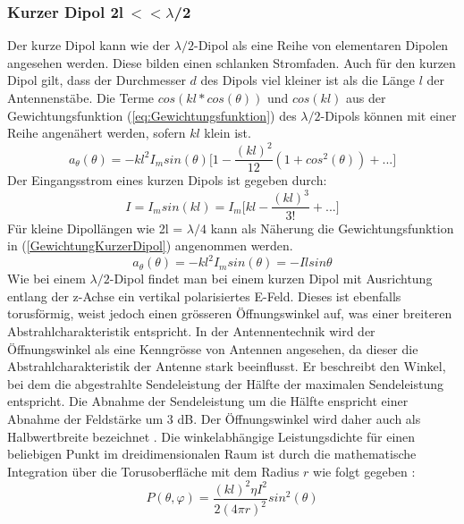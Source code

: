 \newpage
\subsubsection{Kurzer Dipol 2l$ \ <<\lambda$/2}\label{sec:kurzerDipol}
Der kurze Dipol kann wie der $\lambda /2$-Dipol als eine Reihe von elementaren Dipolen angesehen werden. Diese bilden einen schlanken Stromfaden. Auch für den kurzen Dipol gilt, dass der Durchmesser $d$ des Dipols viel kleiner ist als die Länge $l$ der Antennenstäbe. Die Terme $cos(kl*cos(\theta)) $ und $cos(kl)$ aus der Gewichtungsfunktion (\ref{eq:Gewichtungsfunktion}) des $\lambda/2$-Dipols können mit einer Reihe angenähert werden, sofern $kl$ klein ist.
\begin{equation}
a_{\theta}(\theta)=-kl^{2}I_{m}sin(\theta) \biggl\lbrack 1- \frac{(kl)^{2}}{12}(1+cos^{2}(\theta))+...\biggr\rbrack
\end{equation}
Der Eingangsstrom eines kurzen Dipols ist gegeben durch:
\begin{equation}
I=I_{m}sin(kl)=I_{m}\biggl\lbrack kl - \frac{(kl)^{3}}{3!} +... \biggr\rbrack
\end{equation}
 Für kleine Dipollängen wie 2l = $\lambda/4 $ kann als Näherung die Gewichtungsfunktion in (\ref{GewichtungKurzerDipol}) angenommen werden.
\begin{equation}\label{GewichtungKurzerDipol}
a_{\theta}(\theta)=-kl^{2}I_{m}sin(\theta)=-Ilsin\theta
\end{equation}
Wie bei einem $\lambda/2$-Dipol findet man bei einem kurzen Dipol mit Ausrichtung entlang der z-Achse ein vertikal polarisiertes E-Feld. Dieses ist ebenfalls torusförmig, weist jedoch einen grösseren Öffnungswinkel auf, was einer breiteren Abstrahlcharakteristik entspricht. In der Antennentechnik wird der Öffnungswinkel als eine Kenngrösse von Antennen angesehen, da dieser die Abstrahlcharakteristik der Antenne stark beeinflusst. Er beschreibt den Winkel, bei dem die abgestrahlte Sendeleistung der Hälfte der maximalen Sendeleistung entspricht. Die Abnahme der Sendeleistung um die Hälfte enspricht einer Abnahme der Feldstärke um 3 dB. Der Öffnungswinkel wird daher auch als Halbwertbreite bezeichnet \cite{Oeffnungswinkel}. Die winkelabhängige Leistungsdichte für einen beliebigen Punkt im dreidimensionalen Raum ist durch die mathematische Integration über die Torusoberfläche mit dem Radius $r$ wie folgt gegeben \cite{elliott1981antenna}:
\begin{equation}
P(\theta,\varphi)=\frac{(kl)^{2}\eta I^{2}}{2(4\pi r)^{2}}sin^{2}(\theta)
\label{Prad_kurzerDipol}
\end{equation}

